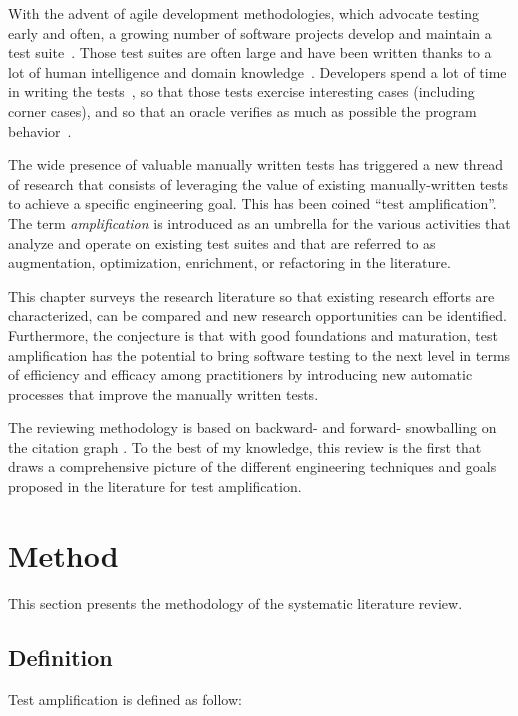 With the advent of agile development methodologies, which advocate testing early and often, a growing number of software projects develop and maintain a test suite~\cite{Madeyski2010}. 
Those test suites are often large and have been written thanks to a lot of human intelligence and domain knowledge~\cite{azaidmanEMSE2011,DBLP:conf/icst/ZaidmanRDD08}. 
Developers spend a lot of time in writing the tests~\cite{BellerTSE,beller2015when,beller2015howmuch}, so that those tests exercise interesting cases (including corner cases), and so that an oracle verifies as much as possible the program behavior~\cite{hilton2018coverageevolution}.

The wide presence of valuable manually written tests has triggered a new thread of research that consists of leveraging the value of existing manually-written tests to achieve a specific engineering goal.
This has been coined ``test amplification''. 
The term \emph{amplification} is introduced as an umbrella for the various activities that analyze and operate on existing test suites and that are referred to as augmentation, optimization, enrichment, or refactoring in the literature. 

This chapter surveys the research literature so that existing research efforts are characterized, can be compared and new research opportunities can be identified.
Furthermore, the conjecture is that with good foundations and maturation, test amplification has the potential to bring software testing to the next level in terms of efficiency and efficacy among practitioners by introducing new automatic processes that improve the manually written tests.

The reviewing methodology is based on backward- and forward- snowballing on the citation graph \cite{jalali2012systematic}.
To the best of my knowledge, this review is the first that draws a comprehensive picture of the different engineering techniques and goals proposed in the literature for test amplification.

\section{Method}
\label{sec:sota:method}
This section presents the methodology of the systematic literature review.

\subsection{Definition}
\label{subsec:sota:method:defition}
Test amplification is defined as follow:

